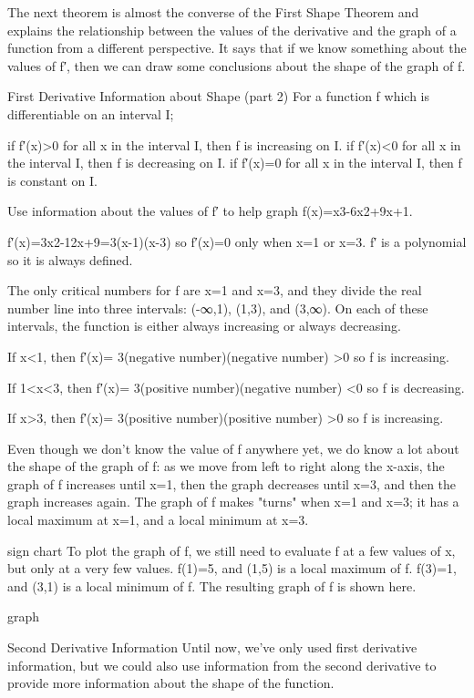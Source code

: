 The next theorem is almost the converse of the First Shape Theorem and explains the relationship between the values of the derivative and the graph of a function from a different perspective. It says that if we know something about the values of f′, then we can draw some conclusions about the shape of the graph of f.

First Derivative Information about Shape (part 2)
For a function f which is differentiable on an interval I;

if f′(x)>0 for all x in the interval I, then f is increasing on I.
if f′(x)<0 for all x in the interval I, then f is decreasing on I.
if f′(x)=0 for all x in the interval I, then f is constant on I.
\begin{example}
Use information about the values of f′ to help graph f(x)=x3-6x2+9x+1.

\begin{solution} f′(x)=3x2-12x+9=3(x-1)(x-3) so f′(x)=0 only when x=1 or x=3. f′ is a polynomial so it is always defined.

The only critical numbers for f are x=1 and x=3, and they divide the real number line into three intervals: (-∞,1), (1,3), and (3,∞). On each of these intervals, the function is either always increasing or always decreasing.

If x<1, then f′(x)= 3(negative number)(negative number) >0 so f is increasing.

If 1<x<3, then f′(x)= 3(positive number)(negative number) <0 so f is decreasing.

If x>3, then f′(x)= 3(positive number)(positive number) >0 so f is increasing.

Even though we don't know the value of f anywhere yet, we do know a lot about the shape of the graph of f: as we move from left to right along the x-axis, the graph of f increases until x=1, then the graph decreases until x=3, and then the graph increases again. The graph of f makes "turns" when x=1 and x=3; it has a local maximum at x=1, and a local minimum at x=3.

sign chart
To plot the graph of f, we still need to evaluate f at a few values of x, but only at a very few values. f(1)=5, and (1,5) is a local maximum of f. f(3)=1, and (3,1) is a local minimum of f. The resulting graph of f is shown here.

graph
\end{solution}\end{example}

Second Derivative Information
Until now, we've only used first derivative information, but we could also use information from the second derivative to provide more information about the shape of the function.


